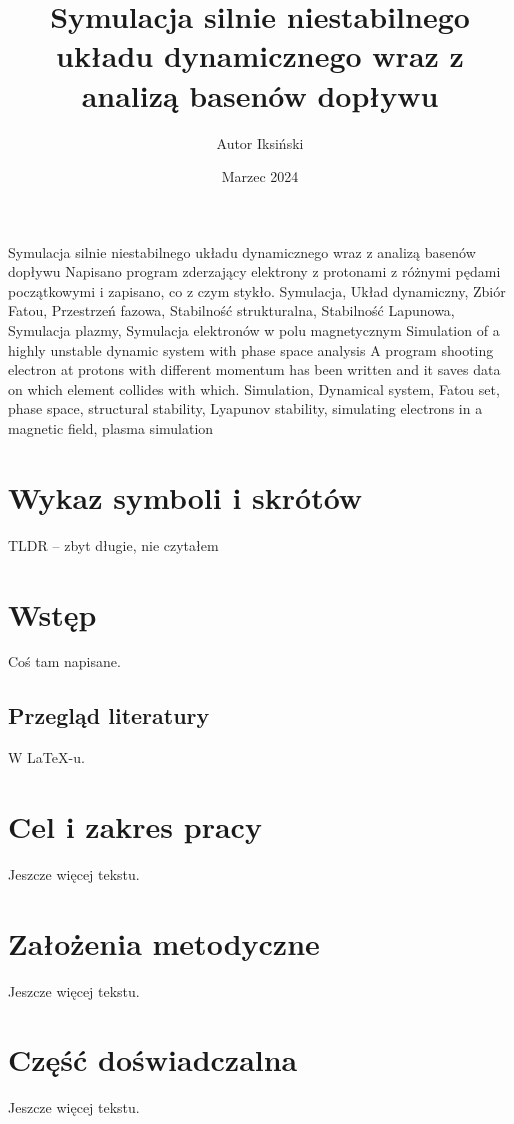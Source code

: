 \documentclass{SGGW-thesis}
\title{Symulacja silnie niestabilnego układu dynamicznego wraz z analizą basenów dopływu}
\author{Autor Iksiński}
\date{Marzec 2024}
\begin{document}
\maketitle
\statementpage
\abstractpage
{Symulacja silnie niestabilnego układu dynamicznego wraz z analizą basenów dopływu}
{Napisano program zderzający elektrony z protonami z różnymi pędami początkowymi i zapisano, co z czym stykło.}
{Symulacja, Układ dynamiczny, Zbiór Fatou, Przestrzeń fazowa, Stabilność strukturalna, Stabilność Lapunowa, Symulacja plazmy, Symulacja elektronów w polu magnetycznym}
{Simulation of a highly unstable dynamic system with phase space analysis}
{A program shooting electron at protons with different momentum has been written and it saves data on which element collides with which.}
{Simulation, Dynamical system, Fatou set, phase space, structural stability, Lyapunov stability, simulating electrons in a magnetic field, plasma simulation}

{
  \doublespacing
  \tableofcontents
}

\startchapterfromoddpage %

\chapter{Wykaz symboli i skrótów}
TLDR -- zbyt długie, nie czytałem

\chapter{Wstęp}
Coś tam napisane. 

\section{Przegląd literatury}
W \LaTeX-u.\cite{talbot2013}

\chapter{Cel i zakres pracy}
Jeszcze więcej tekstu.

\chapter{Założenia metodyczne}
Jeszcze więcej tekstu.

\chapter{Część doświadczalna}
Jeszcze więcej tekstu.
\end{document}
